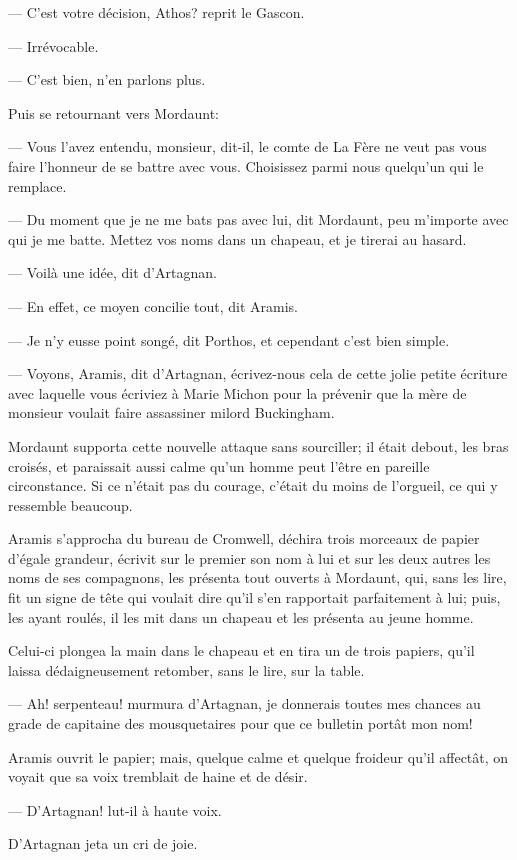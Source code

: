 — C'est votre décision, Athos? reprit le Gascon.

— Irrévocable.

— C'est bien, n'en parlons plus.

Puis se retournant vers Mordaunt:

— Vous l'avez entendu, monsieur, dit-il, le comte de La Fère ne veut pas vous faire l'honneur de se battre avec vous. Choisissez parmi nous quelqu'un qui le remplace.

— Du moment que je ne me bats pas avec lui, dit Mordaunt, peu m'importe avec qui je me batte. Mettez vos noms dans un chapeau, et je tirerai au hasard.

— Voilà une idée, dit d'Artagnan.

— En effet, ce moyen concilie tout, dit Aramis.

— Je n'y eusse point songé, dit Porthos, et cependant c'est bien simple.

— Voyons, Aramis, dit d'Artagnan, écrivez-nous cela de cette jolie petite écriture avec laquelle vous écriviez à Marie Michon pour la prévenir que la mère de monsieur voulait faire assassiner milord Buckingham.

Mordaunt supporta cette nouvelle attaque sans sourciller; il était debout, les bras croisés, et paraissait aussi calme qu'un homme peut l'être en pareille circonstance. Si ce n'était pas du courage, c'était du moins de l'orgueil, ce qui y ressemble beaucoup.

Aramis s'approcha du bureau de Cromwell, déchira trois morceaux de papier d'égale grandeur, écrivit sur le premier son nom à lui et sur les deux autres les noms de ses compagnons, les présenta tout ouverts à Mordaunt, qui, sans les lire, fit un signe de tête qui voulait dire qu'il s'en rapportait parfaitement à lui; puis, les ayant roulés, il les mit dans un chapeau et les présenta au jeune homme.

Celui-ci plongea la main dans le chapeau et en tira un de trois papiers, qu'il laissa dédaigneusement retomber, sans le lire, sur la table.

— Ah! serpenteau! murmura d'Artagnan, je donnerais toutes mes chances au grade de capitaine des mousquetaires pour que ce bulletin portât mon nom!

Aramis ouvrit le papier; mais, quelque calme et quelque froideur qu'il affectât, on voyait que sa voix tremblait de haine et de désir.

— D'Artagnan! lut-il à haute voix.

D'Artagnan jeta un cri de joie.

